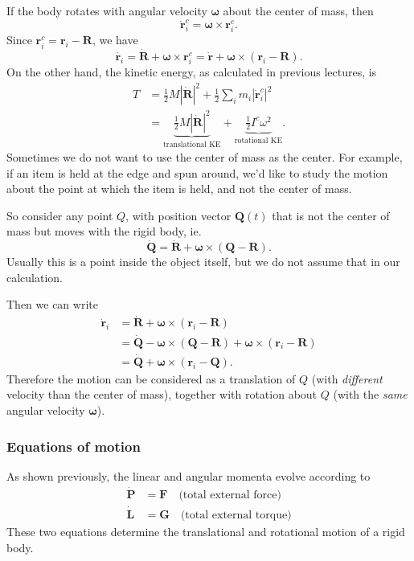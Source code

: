 \documentclass[a4paper]{article}
\begin{document}
If the body rotates with angular velocity $\boldsymbol\omega$ about the center of mass, then
\[
  \dot{\mathbf{r}}_i^c = \boldsymbol\omega \times \mathbf{r}_i^c.
\]
Since $\mathbf{r}_i^c = \mathbf{r}_i - \mathbf{R}$, we have
\[
  \dot{\mathbf{r}_i} = \dot{\mathbf{R}} + \boldsymbol \omega \times \mathbf{r}_i^c = \dot{\mathbf{r}} + \boldsymbol\omega\times (\mathbf{r}_i - \mathbf{R}).
\]
On the other hand, the kinetic energy, as calculated in previous lectures, is
\begin{align*}
  T &= \frac{1}{2}M|\dot{\mathbf{R}}|^2 + \frac{1}{2}\sum_i m_i |\dot{\mathbf{r}}_i^c|^2\\
  &= \underbrace{\frac{1}{2}M|\dot{\mathbf{R}}|^2}_{\text{translational KE}} + \underbrace{\frac{1}{2}I^c\omega^2}_{\text{rotational KE}}.
\end{align*}
Sometimes we do not want to use the center of mass as the center. For example, if an item is held at the edge and spun around, we'd like to study the motion about the point at which the item is held, and not the center of mass.

So consider any point $Q$, with position vector $\mathbf{Q}(t)$ that is not the center of mass but moves with the rigid body, ie.
\[
  \dot{\mathbf{Q}} = \dot{\mathbf{R}} + \boldsymbol\omega\times (\mathbf{Q} - \mathbf{R}).
\]
Usually this is a point inside the object itself, but we do not assume that in our calculation.

Then we can write
\begin{align*}
  \dot{\mathbf{r}}_i &= \dot{\mathbf{R}} + \boldsymbol\omega\times (\mathbf{r}_i - \mathbf{R})\\
  &= \dot{\mathbf{Q}} - \boldsymbol\omega\times (\mathbf{Q} - \mathbf{R}) + \boldsymbol\omega \times (\mathbf{r}_i - \mathbf{R})\\
  &= \dot{\mathbf{Q}} + \boldsymbol\omega\times (\mathbf{r}_i - \mathbf{Q}).
\end{align*}
Therefore the motion can be considered as a translation of $Q$ (with \emph{different} velocity than the center of mass), together with rotation about $Q$ (with the \emph{same} angular velocity $\boldsymbol\omega$).

\subsubsection*{Equations of motion}
As shown previously, the linear and angular momenta evolve according to
\begin{align*}
  \dot{\mathbf{P}} &= \mathbf{F}\quad \text{(total external force)}\\
  \dot{\mathbf{L}} &= \mathbf{G}\quad \text{(total external torque)}
\end{align*}
These two equations determine the translational and rotational motion of a rigid body.
\end{document}
